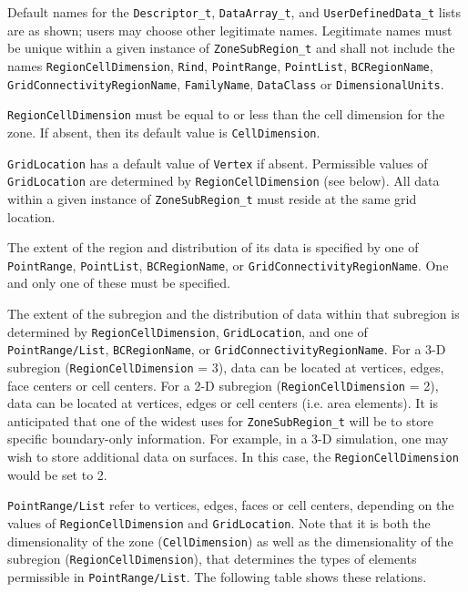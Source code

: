 \begin{notes}
\item Default names for the
      \texttt{Descriptor\_t},
      \texttt{DataArray\_t}, and
      \texttt{UserDefinedData\_t}
      lists are as shown; users may choose other legitimate names.
      Legitimate names must be unique within a given instance of
      \texttt{ZoneSubRegion\_t} and shall not include the names
      \texttt{RegionCellDimension}, \texttt{Rind}, \texttt{PointRange},
      \texttt{PointList}, \texttt{BCRegionName}, \texttt{GridConnectivityRegionName},
      \texttt{FamilyName}, \texttt{DataClass} or \texttt{DimensionalUnits}.
\item \texttt{RegionCellDimension} must be equal to or less than the
      cell dimension for the zone. If absent, then its default value is
      \texttt{CellDimension}.
\item \texttt{GridLocation} has a default value of \texttt{Vertex} if absent.
      Permissible values of \texttt{GridLocation} are determined by
      \texttt{RegionCellDimension} (see below). All data within a given
      instance of \texttt{ZoneSubRegion\_t} must reside at the same grid location.
\item The extent of the region and distribution of its data is specified by one of
      \texttt{PointRange}, \texttt{PointList}, \texttt{BCRegionName}, or
      \texttt{GridConnectivityRegionName}. One and only one of these must be specified.
\end{notes}

The extent of the subregion and the distribution of data within that subregion
is determined by \texttt{RegionCellDimension}, \texttt{GridLocation}, and one of
\texttt{PointRange/List}, \texttt{BCRegionName}, or \texttt{GridConnectivityRegionName}.
For a 3-D subregion (\texttt{RegionCellDimension} = 3), data can be located
at vertices, edges, face centers or cell centers.
For a 2-D subregion (\texttt{RegionCellDimension} = 2),
data can be located at vertices, edges or cell centers (i.e. area elements).
It is anticipated that one of the widest uses for \texttt{ZoneSubRegion\_t}
will be to store specific boundary-only information. For example, in a 3-D simulation,
one may wish to store additional data on surfaces. In this case, the
\texttt{RegionCellDimension} would be set to 2.

\texttt{PointRange/List} refer to vertices, edges, faces or cell centers,
depending on the values of \texttt{RegionCellDimension} and \texttt{GridLocation}.
Note that it is both the dimensionality of the zone (\texttt{CellDimension})
as well as the dimensionality of the subregion (\texttt{RegionCellDimension}),
that determines the types of elements
permissible in \texttt{PointRange/List}. The following table shows these relations.

